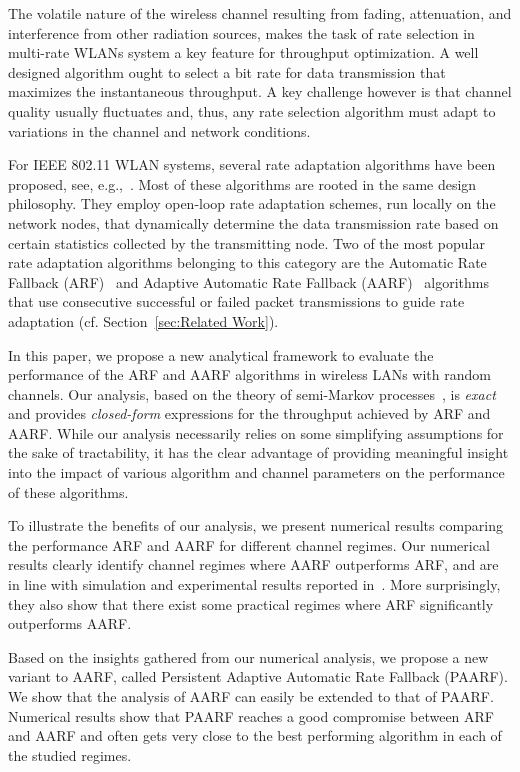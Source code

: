 \documentclass[11pt, journal, letterpaper, oneside, onecolumn]{IEEEtran}
\begin{document}
The volatile nature of the wireless channel resulting from fading,
attenuation, and  interference from other radiation sources, makes
the task of rate selection in multi-rate WLANs system a key
feature for throughput optimization. A well designed algorithm
ought to select a bit rate for data transmission that maximizes
the instantaneous throughput. A key challenge however is that
channel quality usually fluctuates and, thus, any rate selection
algorithm must adapt to variations in the channel and network
conditions.

For IEEE 802.11 WLAN systems, several rate adaptation algorithms
have been proposed, see,
e.g.,~\cite{OrgARF,AARF,AARF_3,RRAA,CARA,Bicket}. Most of these
algorithms are rooted in the same design philosophy. They employ
open-loop rate adaptation schemes, run locally on the network
nodes, that dynamically determine the data transmission rate based
on certain statistics collected by the transmitting node. Two of
the most popular rate adaptation algorithms belonging to this
category are the Automatic Rate Fallback (ARF)~\cite{OrgARF} and
Adaptive Automatic Rate Fallback (AARF)~\cite{AARF} algorithms
that use consecutive successful or failed packet transmissions to
guide rate adaptation (cf. Section~\ref{sec:Related Work}).





In this paper, we propose a new analytical framework to evaluate
the performance of the ARF and AARF algorithms in wireless LANs
with random channels. Our analysis, based on the theory of
semi-Markov processes~\cite{ROSS}, is \emph{exact} and provides
\emph{closed-form} expressions for the throughput achieved by ARF
and AARF.   While our analysis necessarily relies on some
simplifying assumptions for the sake of tractability, it has the
clear advantage of providing meaningful insight into the impact of
various algorithm and channel parameters on the performance of
these algorithms.



To illustrate the benefits of our analysis, we present numerical
results comparing the performance ARF and AARF for different
channel regimes. Our numerical results clearly identify channel
regimes where AARF outperforms ARF, and are in line with
simulation and experimental results reported
in~\cite{Bicket,AARF}. More surprisingly, they also show that
there exist some practical regimes where ARF significantly
outperforms AARF.

Based on the insights gathered from our numerical analysis, we
propose a new variant to AARF, called Persistent Adaptive
Automatic Rate Fallback (PAARF). We show that the analysis of AARF
can easily be extended to that of PAARF. Numerical results show
that PAARF reaches a good compromise between ARF and AARF and
often gets very close to the best performing algorithm  in each of
the studied regimes.
\end{document}
